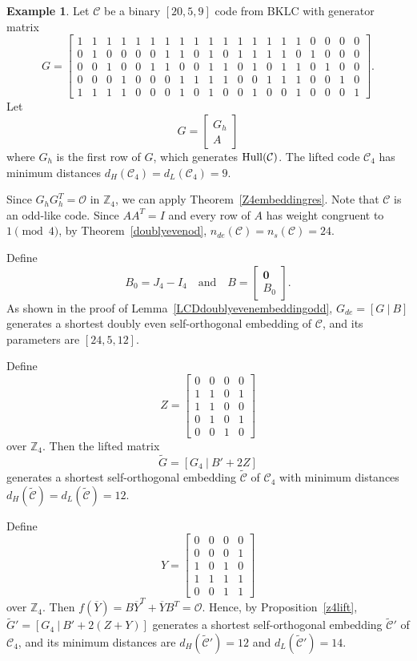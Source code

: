 \documentclass{article}
\theoremstyle{definition}
\newtheorem{example}{Example}[section]
\theoremstyle{remark}
\begin{document}
\begin{example}
Let $\mathcal{C}$ be a binary $[20, 5, 9]$ code from BKLC with generator matrix
\[
G=
\begin{bmatrix}
1&1&1&1&1&1&1&1&1&1&1&1&1&1&1&1&0&0&0&0\\
0&1&0&0&0&0&1&1&0&1&0&1&1&1&1&0&1&0&0&0\\
0&0&1&0&0&1&1&0&0&1&1&0&1&0&1&1&0&1&0&0\\
0&0&0&1&0&0&0&1&1&1&1&0&0&1&1&1&0&0&1&0\\
1&1&1&1&0&0&0&1&0&1&0&0&1&0&0&1&0&0&0&1
\end{bmatrix}.
\]
Let
\[
G=\begin{bmatrix}
    G_h\\A
\end{bmatrix}
\]
where $G_h$ is the first row of $G$, which generates ${\rm Hull}(\mathcal{C})$. The lifted code $\mathcal{C}_4$ has minimum distances $d_H(\mathcal{C}_4)=d_L(\mathcal{C}_4)=9$.

Since $G_hG_h^T=\mathcal{O}$ in $\mathbb{Z}_4$, we can apply Theorem~\ref{Z4embeddingres}. Note that $\mathcal{C}$ is an odd-like code. Since $AA^T=I$ and every row of $A$ has weight congruent to $1\pmod 4$, by Theorem~\ref{doublyevenod}, $n_{de}(\mathcal{C})=n_s(\mathcal{C})=24$.

Define
\[
B_0=J_4-I_4\quad\mbox{and}\quad B=\begin{bmatrix}\mathbf{0}\\B_0\end{bmatrix}.
\]
As shown in the proof of Lemma~\ref{LCDdoublyevenembeddingodd}, $G_{de}=[G~|~B]$ generates a shortest doubly even self-orthogonal embedding of $\mathcal{C}$, and its parameters are $[24, 5, 12]$.

Define
\[
Z=\begin{bmatrix}
    0 & 0 & 0 & 0\\1 & 1 & 0 & 1\\1 & 1 & 0 & 0\\0 & 1 & 0 & 1\\0 & 0 & 1 & 0
\end{bmatrix}
\]
over $\mathbb{Z}_4$. Then the lifted matrix
\[
\tilde{G}=[G_4~|~B'+2Z]
\]
generates a shortest self-orthogonal embedding $\tilde{\mathcal{C}}$ of $\mathcal{C}_4$ with minimum distances $d_H(\tilde{\mathcal{C}})=d_L(\tilde{\mathcal{C}})=12$.

Define
\[
Y=\begin{bmatrix}
    0 & 0 & 0 & 0\\0 & 0 & 0 & 1\\1 & 0 & 1 & 0\\1 & 1 & 1 & 1\\0 & 0 & 1 & 1
\end{bmatrix}
\]
over $\mathbb{Z}_4$. Then $f(\overline{Y})=B\overline{Y}^T+\overline{Y}B^T=\mathcal{O}$. Hence, by Proposition~\ref{z4lift}, $\tilde{G}'=[G_4~|~B'+2(Z+Y)]$ generates a shortest self-orthogonal embedding $\tilde{\mathcal{C}}'$ of $\mathcal{C}_4$, and its minimum distances are $d_H(\tilde{\mathcal{C}}')=12$ and $d_L(\tilde{\mathcal{C}}')=14$.
\end{example}
\end{document}
